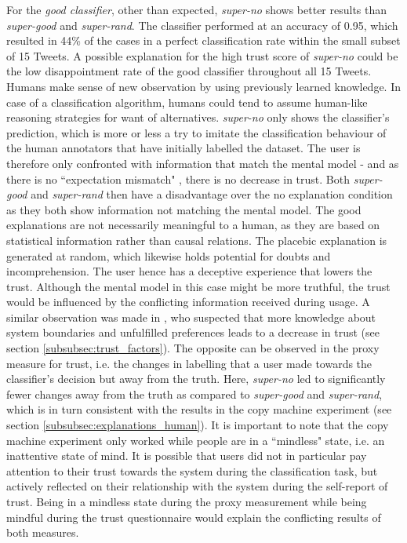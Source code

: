 For the \textit{good classifier}, other than expected, \textit{super-no} shows better results than \textit{super-good} and \textit{super-rand}. The classifier performed at an accuracy of 0.95, which resulted in 44\% of the cases in a perfect classification rate within the small subset of 15 Tweets. A possible explanation for the high trust score of \textit{super-no} could be the low disappointment rate of the good classifier throughout all 15 Tweets. Humans make sense of new observation by using previously learned knowledge. In case of a classification algorithm, humans could tend to assume human-like reasoning strategies for want of alternatives. \textit{super-no} only shows the classifier's prediction, which is more or less a try to imitate the classification behaviour of the human annotators that have initially labelled the dataset. The user is therefore only confronted with information that match the mental model - and as there is no ``expectation mismatch" \cite{glass2008toward}, there is no decrease in trust. Both \textit{super-good} and \textit{super-rand} then have a disadvantage over the no explanation condition as they both show information not matching the mental model. The good explanations are not necessarily meaningful to a human, as they are based on statistical information rather than causal relations. The placebic explanation is generated at random, which likewise holds potential for doubts and incomprehension. The user hence has a deceptive experience that lowers the trust. Although the mental model in this case might be more truthful, the trust would be influenced by the conflicting information received during usage. A similar observation was made in \cite{cramer2008effects}, who suspected that more knowledge about system boundaries and unfulfilled preferences leads to a decrease in trust (see section \ref{subsubsec:trust_factors}). The opposite can be observed in the proxy measure for trust, i.e. the changes in labelling that a user made towards the classifier's decision but away from the truth. Here, \textit{super-no} led to significantly fewer changes away from the truth as compared to \textit{super-good} and \textit{super-rand}, which is in turn consistent with the results in the copy machine experiment (see section \ref{subsubsec:explanations_human}). It is important to note that the copy machine experiment only worked while people are in a ``mindless" state, i.e. an inattentive state of mind. It is possible that users did not in particular pay attention to their trust towards the system during the classification task, but actively reflected on their relationship with the system during the self-report of trust. Being in a mindless state during the proxy measurement while being mindful during the trust questionnaire would explain the conflicting results of both measures.\newline
